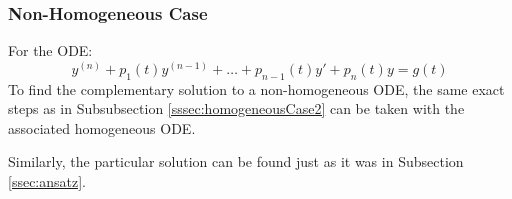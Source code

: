 \documentclass[12pt]{article}
\begin{document}
\subsubsection{Non-Homogeneous Case}
\label{sssec:nonHomogeneousCase2}

For the ODE:
\begin{equation*}
  y^{(n)} + p_1(t)y^{(n-1)} + \hdots + p_{n-1}(t)y' + p_n(t)y = g(t)
\end{equation*}
To find the complementary solution to a non-homogeneous ODE, the same exact steps as in Subsubsection \ref{sssec:homogeneousCase2} can be taken with the associated homogeneous ODE.

Similarly, the particular solution can be found just as it was in Subsection \ref{ssec:ansatz}.
\end{document}
